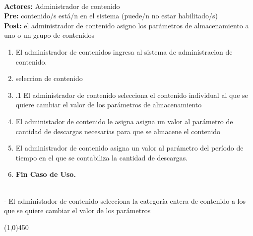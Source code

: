 \documentclass[11pt, a4paper, spanish]{article}
\begin{document}
{ \\
\textbf{Actores:} Administrador de contenido \\
\textbf{Pre:} contenido/s está/n en el sistema (puede/n no estar habilitado/s) \\
\textbf{Post:} el administrador de contenido asigno los parámetros de almacenamiento a uno o un grupo de contenidos \\
\begin{enumerate}
	\item El administrador de contenidos ingresa al sistema de administracion de contenido.
	\item seleccion de contenido
	\item .1 El administrador de contenido selecciona el contenido individual al que se quiere cambiar el valor de los parámetros de almacenamiento
	\item El administador de contenido le asigna asigna un valor al parámetro de cantidad de descargas necesarias para que se almacene el contenido
	\item El administrador de contenido asigna un valor al parámetro del período de tiempo en el que se contabiliza la cantidad de descargas. 
\item \textbf{Fin Caso de Uso.} \\

\end{enumerate}
 \\
 - El administador de contenido selecciona la categoría entera de contenido a los que se quiere cambiar el valor de los parámetros
\begin{center} \line(1,0){450} \end{center}


}
\end{document}
